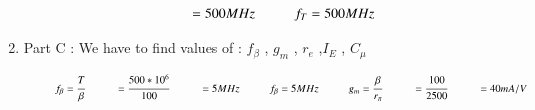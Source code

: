 \begin{enumerate}[label=\thesubsection.\arabic*.,ref=\thesubsection.\theenumi]
\begin{align}
             \vspace{0.5cm}
             
    \hspace{1cm}         = 500 MHz
             
             \vspace{0.5cm}
  
\hspace{1cm}       f_{T} = 500 MHz  
       
       \vspace{1cm}

\end{align}

\item
Part C : We have to find values of :
 $f_{\beta}$ , $g_{m}$ , $r_{e}$ ,$I_{E}$ , $C_{\mu}$
 
  \vspace{0.5cm}
 
 \solution

\begin{align}

\hspace{1cm}  f_{\beta} = \cfrac{{T}}{\beta}
  
  \vspace{0.5cm}
  
\hspace{1cm}        = \cfrac{500*{10^6}}{100}
        
        \vspace{0.5cm}
        
\hspace{1cm}        = 5 MHz
        
        \vspace{0.5cm}
        
\hspace{1cm}        f_{\beta} = 5 MHz
        
        \vspace{1cm}

\hspace{1cm}      g_{m} = \cfrac{\beta}{r_{\pi}}
      
      \vspace{0.5cm}
      
\hspace{1cm}        = \cfrac{100}{2500}
        
        \vspace{0.5cm}
        
    \hspace{1cm}    = 40 mA/V
        

\end{align}
\end{enumerate}
